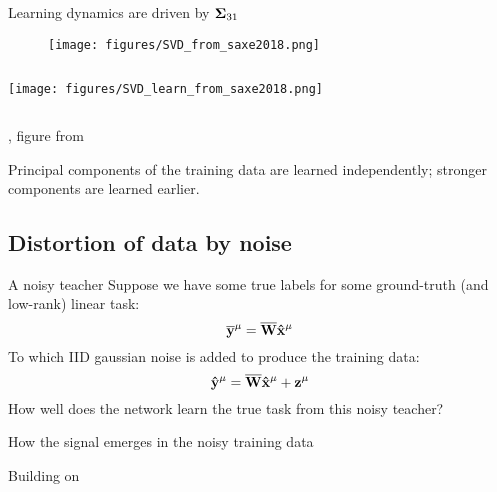 \documentclass{beamer}
\newcommand{\bb}[1]{{\bf\overline{#1}}}
\newcommand{\bh}[1]{{\bf\hat{#1}}}
\begin{document}
\begin{frame}{Learning dynamics are driven by ${\bf\Sigma}_{31}$}
\begin{figure}
\centering
\texttt{[image: figures/SVD\_from\_saxe2018.png]}
\end{figure}
\begin{columns}
\begin{column}{0.5\textwidth}
\texttt{[image: figures/SVD\_learn\_from\_saxe2018.png]}
\end{column}
\begin{column}{0.5\textwidth}
\centering
{}
\end{column}
\end{columns}
{\footnotesize \citep{Saxe2013}, figure from \citep{Saxe2018}}
\end{frame}

\begin{frame}[standout]
Principal components of the training data are learned independently; stronger components are learned earlier.
\end{frame}

\subsection{Distortion of data by noise}
\begin{frame}{A noisy teacher}
Suppose we have some true labels for some ground-truth (and low-rank) linear task:
$$\bb{y}^{\mu} = \bb{W}\bh{x}^\mu$$
To which IID gaussian noise is added to produce the training data:
$$\bh{y}^{\mu} = \bb{W}\bh{x}^\mu + \bf{z} ^ \mu$$
How well does the network learn the true task from this noisy teacher? 
\end{frame}

\begin{frame}{How the signal emerges in the noisy training data}
\vspace{-0.5em}
\begin{center}%
%
%
%
\end{center}
\vspace{-1em}
{\footnotesize Building on \citet{Benaych-Georges2012}}
\end{frame}
\end{document}
